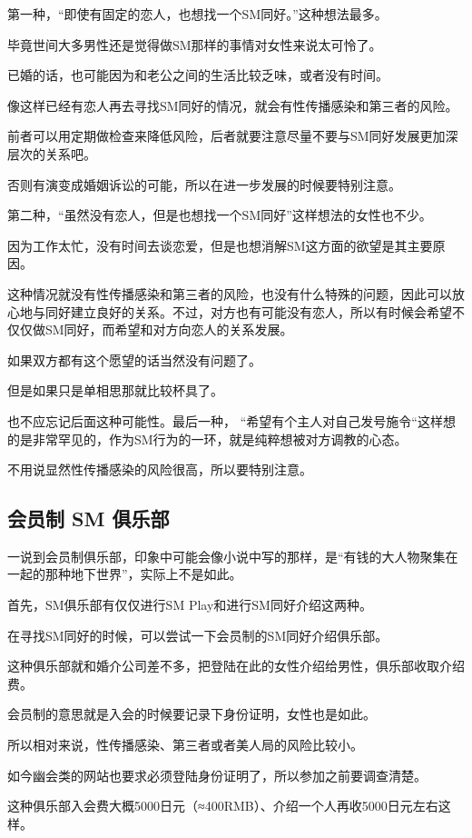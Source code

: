\documentclass[12pt,UTF8]{ctexbook}
\begin{document}
第一种，“即使有固定的恋人，也想找一个SM同好。”这种想法最多。

毕竟世间大多男性还是觉得做SM那样的事情对女性来说太可怜了。

已婚的话，也可能因为和老公之间的生活比较乏味，或者没有时间。

像这样已经有恋人再去寻找SM同好的情况，就会有性传播感染和第三者的风险。

前者可以用定期做检查来降低风险，后者就要注意尽量不要与SM同好发展更加深层次的关系吧。

否则有演变成婚姻诉讼的可能，所以在进一步发展的时候要特别注意。

第二种，“虽然没有恋人，但是也想找一个SM同好”这样想法的女性也不少。

因为工作太忙，没有时间去谈恋爱，但是也想消解SM这方面的欲望是其主要原因。

这种情况就没有性传播感染和第三者的风险，也没有什么特殊的问题，因此可以放心地与同好建立良好的关系。不过，对方也有可能没有恋人，所以有时候会希望不仅仅做SM同好，而希望和对方向恋人的关系发展。

如果双方都有这个愿望的话当然没有问题了。

但是如果只是单相思那就比较杯具了。

也不应忘记后面这种可能性。最后一种， “希望有个主人对自己发号施令“这样想的是非常罕见的，作为SM行为的一环，就是纯粹想被对方调教的心态。

不用说显然性传播感染的风险很高，所以要特别注意。

\subsection{会员制 SM 俱乐部}

一说到会员制俱乐部，印象中可能会像小说中写的那样，是“有钱的大人物聚集在一起的那种地下世界”，实际上不是如此。

首先，SM俱乐部有仅仅进行SM Play和进行SM同好介绍这两种。

在寻找SM同好的时候，可以尝试一下会员制的SM同好介绍俱乐部。

这种俱乐部就和婚介公司差不多，把登陆在此的女性介绍给男性，俱乐部收取介绍费。

会员制的意思就是入会的时候要记录下身份证明，女性也是如此。

所以相对来说，性传播感染、第三者或者美人局的风险比较小。

如今幽会类的网站也要求必须登陆身份证明了，所以参加之前要调查清楚。

这种俱乐部入会费大概5000日元（≈400RMB）、介绍一个人再收5000日元左右这样。
\end{document}
